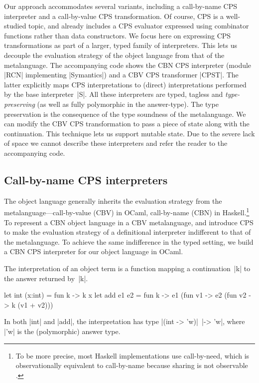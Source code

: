 Our approach accommodates
several variants, including
a call-by-name CPS interpreter and a call-by-value CPS
transformation.
Of course, CPS is a well-studied topic, and \citet{Thiemann-combinators} already includes a
CPS evaluator expressed
using combinator functions rather than data constructors.
We focus here on expressing CPS transformations as part of a larger,
typed family of interpreters.
\ifshort\label{state}\label{S:CPS}%
This lets us decouple the evaluation strategy of the object language
from that of the metalanguage. The accompanying code shows the CBN CPS
interpreter (module |RCN| implementing |Symantics|) and a CBV CPS
transformer |CPST|. The latter explicitly maps CPS interpretations to
(direct) interpretations performed by the base interpreter~|S|. All
these interpreters are typed, tagless and \emph{type-preserving} (as
well as fully polymorphic in the answer-type). The type preservation
is the consequence of the type soundness of the metalanguage.  We can
modify the CBV CPS transformation to pass a piece of state along with
the continuation. This technique lets us support mutable state.  Due
to the severe lack of space we cannot describe these interpreters and
refer the reader to the accompanying code.

\else

\subsection{Call-by-name CPS interpreters}\label{S:CPS}

The object language generally inherits the evaluation strategy from
the metalanguage---call-by-value (CBV) in OCaml, call-by-name (CBN) in
Haskell.\footnote{To be more precise, most Haskell implementations
use call-by-need, which is observationally equivalent to call-by-name
because sharing is not observable \citep{ariola-call-by-need-popl}.}
To represent a CBN object language in a CBV metalanguage,
\citet{reynolds-definitional,reynolds-relation} and \citet{PlotkinCBN}
introduce CPS to make the evaluation strategy of a definitional
interpreter indifferent to that of the metalanguage. To achieve the same
indifference in the typed setting, we build a CBN CPS interpreter for
our object language in OCaml.

The interpretation of an object term is a function
mapping a continuation~|k| to the answer
returned by~|k|.
\begin{code}
let int (x:int) = fun k -> k x
let add e1 e2 = fun k -> e1 (fun v1 -> e2 (fun v2 -> k (v1 + v2)))
\end{code}
In both |int| and |add|, the interpretation has type 
|(int -> 'w)|\texttt{ }|-> 'w|, where |'w| is the (polymorphic) answer type.

